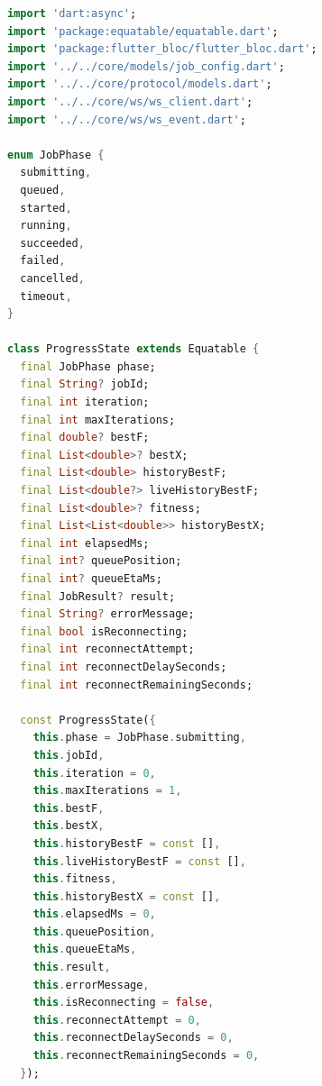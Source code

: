 \begin{lstlisting}[language=Dart, caption={Обработка прогресса выполнения и накопление истории сходимости (mobile/lib/features/progress/progress\_cubit.dart)}, label={lst:progress-cubit-dart}]
import 'dart:async';
import 'package:equatable/equatable.dart';
import 'package:flutter_bloc/flutter_bloc.dart';
import '../../core/models/job_config.dart';
import '../../core/protocol/models.dart';
import '../../core/ws/ws_client.dart';
import '../../core/ws/ws_event.dart';

enum JobPhase {
  submitting,
  queued,
  started,
  running,
  succeeded,
  failed,
  cancelled,
  timeout,
}

class ProgressState extends Equatable {
  final JobPhase phase;
  final String? jobId;
  final int iteration;
  final int maxIterations;
  final double? bestF;
  final List<double>? bestX;
  final List<double> historyBestF;
  final List<double?> liveHistoryBestF;
  final List<double>? fitness;
  final List<List<double>> historyBestX;
  final int elapsedMs;
  final int? queuePosition;
  final int? queueEtaMs;
  final JobResult? result;
  final String? errorMessage;
  final bool isReconnecting;
  final int reconnectAttempt;
  final int reconnectDelaySeconds;
  final int reconnectRemainingSeconds;

  const ProgressState({
    this.phase = JobPhase.submitting,
    this.jobId,
    this.iteration = 0,
    this.maxIterations = 1,
    this.bestF,
    this.bestX,
    this.historyBestF = const [],
    this.liveHistoryBestF = const [],
    this.fitness,
    this.historyBestX = const [],
    this.elapsedMs = 0,
    this.queuePosition,
    this.queueEtaMs,
    this.result,
    this.errorMessage,
    this.isReconnecting = false,
    this.reconnectAttempt = 0,
    this.reconnectDelaySeconds = 0,
    this.reconnectRemainingSeconds = 0,
  });


\end{lstlisting}
